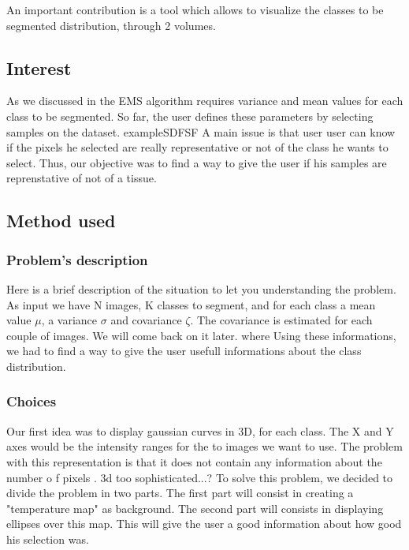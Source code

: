 An important contribution is a tool which allows to visualize the classes to be segmented distribution, through 2 volumes.
\subsection{Interest}
As we discussed in 
the EMS algorithm requires variance and mean values for each class to be segmented. So far, the user defines these parameters by selecting samples on the dataset.
%
exampleSDFSF
%
A main issue is that user user can know if the pixels he selected are really representative or not of the class he wants to select. Thus, our objective  was to find a way to give the user if his samples are reprenstative of not of a tissue.
\subsection{Method used}
\subsubsection{Problem's description}
Here is a brief description of the situation to let you understanding the problem. As input we have N images, K classes to segment, and for each class a mean value $\mu$, a variance $\sigma$ and covariance $\zeta$. The covariance is estimated for each couple of images. We will come back on it later.
%
where
%
Using these informations, we had to find a way to give the user usefull informations about the class distribution.
\subsubsection{Choices}
Our first idea was to display gaussian curves in 3D, for each class. The X and Y axes would be the intensity ranges for the to images we want to use.
The problem with this representation is that it does not contain any information about the number o
%
f pixels .  3d too sophisticated...?
%
To solve this problem, we decided to divide the problem in two parts.
The first part will consist in creating a "temperature map" as background.
The second part will consists in displaying ellipses over this map. This will give the user a good information about how good his selection was.

